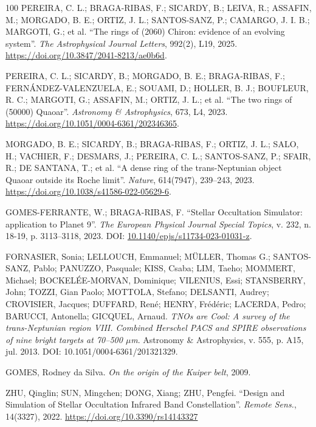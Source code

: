 \documentclass[msc]{on} %
\begin{document}
\begin{thebibliography}{100}
 PEREIRA, C. L.; BRAGA-RIBAS, F.; SICARDY, B.; LEIVA, R.; ASSAFIN, M.; MORGADO, B. E.; ORTIZ, J. L.; SANTOS-SANZ, P.; CAMARGO, J. I. B.; MARGOTI, G.; et al. ``The rings of (2060) Chiron: evidence of an evolving system''. \emph{The Astrophysical Journal Letters}, 992(2), L19, 2025. \url{https://doi.org/10.3847/2041-8213/ae0b6d}.

 PEREIRA, C. L.; SICARDY, B.; MORGADO, B. E.; BRAGA-RIBAS, F.; FERNÁNDEZ-VALENZUELA, E.; SOUAMI, D.; HOLLER, B. J.; BOUFLEUR, R. C.; MARGOTI, G.; ASSAFIN, M.; ORTIZ, J. L.; et al. ``The two rings of (50000) Quaoar''. \emph{Astronomy \& Astrophysics}, 673, L4, 2023. \url{https://doi.org/10.1051/0004-6361/202346365}.

 MORGADO, B. E.; SICARDY, B.; BRAGA-RIBAS, F.; ORTIZ, J. L.; SALO, H.; VACHIER, F.; DESMARS, J.; PEREIRA, C. L.; SANTOS-SANZ, P.; SFAIR, R.; DE SANTANA, T.; et al. ``A dense ring of the trans-Neptunian object Quaoar outside its Roche limit''. \emph{Nature}, 614(7947), 239--243, 2023. \url{https://doi.org/10.1038/s41586-022-05629-6}.

 GOMES-FERRANTE, W.; BRAGA-RIBAS, F. ``Stellar Occultation Simulator: application to Planet 9''. \emph{The European Physical Journal Special Topics}, v. 232, n. 18-19, p. 3113--3118, 2023. DOI: \href{https://doi.org/10.1140/epjs/s11734-023-01031-z}{10.1140/epjs/s11734-023-01031-z}.

 FORNASIER, Sonia; LELLOUCH, Emmanuel; MÜLLER, Thomas G.; SANTOS-SANZ, Pablo; PANUZZO, Pasquale; KISS, Csaba; LIM, Taeho; MOMMERT, Michael; BOCKELÉE-MORVAN, Dominique; VILENIUS, Essi; STANSBERRY, John; TOZZI, Gian Paolo; MOTTOLA, Stefano; DELSANTI, Audrey; CROVISIER, Jacques; DUFFARD, René; HENRY, Frédéric; LACERDA, Pedro; BARUCCI, Antonella; GICQUEL, Arnaud. \textit{TNOs are Cool: A survey of the trans-Neptunian region VIII. Combined Herschel PACS and SPIRE observations of nine bright targets at 70--500 $\mu$m}. Astronomy \& Astrophysics, v. 555, p. A15, jul. 2013. DOI: 10.1051/0004-6361/201321329.

 GOMES, Rodney da Silva. \textit{On the origin of the Kuiper belt}, 2009.

 ZHU, Qinglin; SUN, Mingchen; DONG, Xiang; ZHU, Pengfei. ``Design and Simulation of Stellar Occultation Infrared Band Constellation''. \emph{Remote Sens.}, 14(3327), 2022. \url{https://doi.org/10.3390/rs14143327}


\end{thebibliography}
\end{document}
